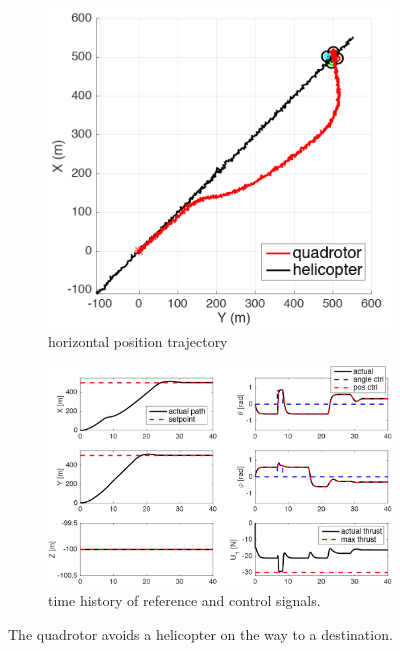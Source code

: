 \documentclass[journal,11pt,onecolumn,draftclsnofoot,]{IEEEtran}
\begin{document}
\begin{figure}
    \centering
    \begin{subfigure}[b]{0.35\columnwidth}
        \centering
        \includegraphics[width=\columnwidth]{trajectory}
        \caption{horizontal position trajectory}
        \label{fig:trajectory}
    \end{subfigure}
	\hfill
    \begin{subfigure}[b]{0.6\columnwidth}
        \centering
        \includegraphics[width=\columnwidth]{tracking}
        \caption{time history of reference and control signals.}
        \label{fig:tracking}
    \end{subfigure}
    
    \caption{The quadrotor avoids a helicopter on the way to a destination.}
    \label{fig:waypoint_avoidance}
\end{figure}
\end{document}
